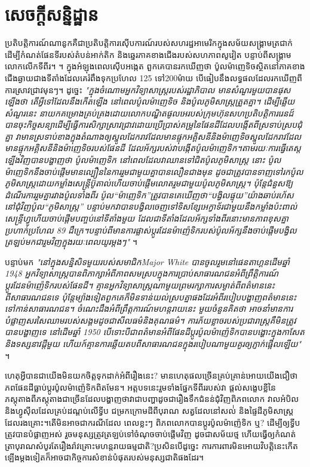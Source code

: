 \documentclass[10pt,twocolumn,letterpaper]{article}
\begin{document}
\section{សេចក្តីសន្និដ្ឋាន}

ប្រតិបត្តិការណ៍ណានូកគឺជាប្រតិបត្តិការស៊ើបការណ៍របស់សហរដ្ឋអាមេរិកក្នុងសម័យសង្គ្រាមត្រជាក់ ដើម្បីកំណត់ផែនទីរបស់តំបន់អាក់តិក និងឆ្នេរភាគខាងជើងរបស់សហភាពសូវៀត បន្ទាប់ពីសង្គ្រាមលោកលើកទីពីរ។ \cite{137}។ ក្នុងអំឡុងពេលស៊ើបអង្កេត ពួកគេបានរកឃើញថា ប៉ូលម៉ាញេទិចស្ថិតនៅភាគខាងជើងឆ្ងាយជាងទីតាំងដែលគេរំពឹងទុកប្រហែល 125 ទៅ200ម៉ាយ បើធៀបនឹងលទ្ធផលដែលរកឃើញពីការស្រាវជ្រាវមុនៗ។ ដូច្នេះ \textit{"ក្នុងចំណោមអ្នកវិទ្យាសាស្ត្ររបស់រដ្ឋាភិបាល មានសំណួរមួយបានផុសឡើងថា តើអ្វីទៅដែលនឹងកើតឡើង នៅពេលប៉ូលម៉ាញេទិច និងប៉ូលភូមិសាស្ត្រត្រួតគ្នា។ ដើម្បីឆ្លើយសំណួរនេះ នាយកគម្រោងគ្រប់គ្រងដោយលោកបណ្ឌិត​ផូល​អេ​របស់ក្រុមហ៊ុនសហប្រតិបត្តិការ​រេនដ៍បានចុះកិច្ចសន្យាដើម្បីធ្វើការសិក្សាស្រាវជ្រាវដោយប្រើប្រាស់គម្រូនៃផែនដីដែលបង្កើតពីស្រទាប់ស្របជុំគ្នា វាមានស្រទាប់ខាងក្នុងតំណាងឲ្យស្នូលដែករាវដែលមានផ្ទុកអគ្គិសនីនិងម៉ាញេទិច​ស្នូលដែករាវដែលមានផ្ទុកអគ្គិសនីនិងម៉ាញេទិចរបស់ផែនដី ដែលអ័ក្សរបស់វាបង្កើតប៉ូលម៉ាញេទិក។តាមរយៈការធ្វើតេស្តឡើងវិញបានបង្ហាញថា ប៉ូលម៉ាញេទិក នៅពេលដែលវាឈានទៅជិតប៉ូលភូមិសាស្រ្ត នោះ ប៉ូលម៉ាញេទិកនឹងចាប់ផ្តើមមានល្បឿននៃការរួមជាមួយគ្នាបានលឿនជាងមុន ដូចជាត្រូវបានទាញទៅរកប៉ូលភូមិសាស្រ្តដោយកម្លាំងសេន្ដ្រីប៊ូតាល់ហើយចាប់ផ្តើមលោតរួមជាមួយប៉ូលភូមិសាស្រ្ត។
ប៉ុន្តែជំនួសឱ្យដំណើរការរួមគ្នារវាងប៉ូលទាំងពីរ ប៉ូល“ម៉ាញេទិក”ត្រូវបានគេឃើញថា“បង្វិលផ្ទុយ”យ៉ាងឆាប់រហ័សនៅជុំវិញប៉ូល“ភូមិសាស្ត្រ” បន្ទាប់មកវាបានបង្វិលចេញទៅទិសខ្សែអេក្វាទ័រជាមួយនឹងកម្លាំងប៉ះពាល់សេន្ទ្រីហ្វូហើយចាប់ផ្ដើមបញ្ចប់នៅទីតាំងមួយ ដែលជាទីតាំងដែលអ័ក្សទាំងពីរនោះមានភាពខុសគ្នាប្រហាក់ប្រហែល 89 ដឺក្រេ។បន្ទាប់ពីមានការផ្លាស់ប្តូរដែនម៉ាញ៉េទិករបស់ប៉ូល​អ័ក្សនឹងចាប់ផ្តើមបង្វិលត្រឡប់មកជារួមវិញក្នុងរយៈពេលយូរម្ដងៗ"} \cite{138,139}។

បន្ទាប់មក \textit{"នៅក្នុងសន្និសិទមួយរបស់សមាជិក​Major White បានចូលរួមនៅផេនតាហ្គនដើមឆ្នាំ 1948 អ្នកវិទ្យាសាស្ត្របានពិភាក្សាអំពីភាពសមស្របក្នុងការប្រាប់សាធារណជនអំពីព្រឹត្តិការណ៍ប្តូរដែនម៉ាញ៉េទិករបស់ផែនដី។ គ្មានអ្នកវិទ្យាសាស្ត្រណាមួយព្រមរក្សាការសម្ងាត់ពីពត៌មាននេះពីសាធារណជនទេ ប៉ុន្តែម្យ៉ាងទៀតពួកគេក៏មិនទាន់យល់ស្របគ្នាផងដែរអំពីរបៀបបង្ហាញពត៌មាននេះទៅកាន់សាធារណជន។ ចំណេះដឹងអំពីព្រឹត្តការណ៍មហន្តរាយនេះ មួយចំនួនគិតថា អាចនាំមានការបំផ្លាញសរសៃឈាមរបស់សង្គមដូចជាសីលធម៌និងគុណធម៌។ ការភ័យខ្លាចរបស់ប្រជារាស្ត្រគឺមិនត្រូវបានបង្ហាញទេ នៅដើមឆ្នាំ 1950 បើទោះបីជាពត៌មានអំពីផែនដីប្តូរប៉ូលម៉ាញ៉េទិកបានបង្ហោះក្នុងកាសែតនិងទស្សនាវដ្តីមួយ ហើយក៍គ្មានការឆ្លើយតបពីសាធារណជនក្នុងរបៀបណាមួយគួរឲ្យភ្ញាក់ផ្អើលឡើយ"} \cite{138,139}។

ហេតុអ្វីបានជា​យើងមិនយកចិត្តទុកដាក់អំពីរឿងនេះ? មានហេតុផលច្រើនគ្រប់គ្រាន់អោយយើងជឿថាភពផែនដីធ្លាប់ប្តូរប៉ូលម៉ាញ៉េទិកពិតមែន។ អត្តបទនេះរួមទាំងផ្នែកទីពីររបស់វា ផ្ដល់សង្ខេបខ្លីនៃភស្តុតាងពីភស្តុតាងជាច្រើនដែលបង្ហាញថាវាជាបញ្ហា​ដូចជារឿងទឹកជំនន់ជុំវិញពិភពលោក វាលអំបិលនិងហ្វូស៊ីលដែលគ្រប់ដណ្តប់លើទ្វីប ជម្រកក្រោមដីពីបុរាណ សត្វដែលនៅសល់់ និងផ្ទៃដីភូមិសាស្ត្រដែលរងគ្រោះ។តើមិនអាចជាករណីដែល ពេលខ្លះៗ ពិភពលោកបានប្តូរប៉ូលម៉ាញ៉េទិក ឬ? ដើម្បីឲ្យទ្វីបត្រូវបានបំផ្លាញអស់ រួចមនុស្សត្រូវត្រឡប់ទៅចំណុចចាប់ផ្ដើមវិញ ដូចជាសម័យថ្ម ហើយធ្វើឲ្យកំណត់ត្រាបុរាណសំបូរតែរឿងរ៉ាវគ្រោះមហន្តរាយធម្មជាតិ?ប្រសិនបើដូច្នេះ ការការពារមិនអោយវិបត្តិនេះកើតឡើងម្ដងទៀតក៏អាចជាកិច្ចការសំខាន់បំផុតរបស់មនុស្សជាតិផងដែរ។
\end{document}
